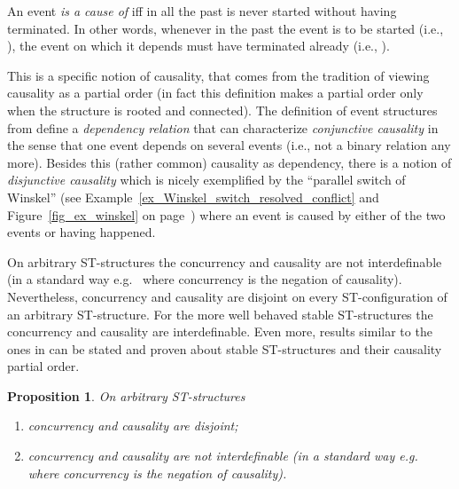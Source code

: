 \documentclass[submission,copyright,creativecommons]{eptcs}
\newtheorem{proposition}[theorem]{Proposition}
\begin{document}
An event \textit{ is a cause of } 
iff in all the past  is never started without  having terminated. In other words, whenever in the past the event  is to be started (i.e., ), the event  on which it depends must have terminated already (i.e., ).

This is a specific notion of causality, that comes from the tradition of viewing causality as a partial order (in fact this definition makes a partial order only when the structure is rooted and connected). The definition of event structures from \cite{GlabbeekP09configStruct} define a \textit{dependency relation} that can characterize \textit{conjunctive causality} in the sense that one event depends on several events (i.e., not a binary relation any more). Besides this (rather common) causality as dependency, there is a notion of \textit{disjunctive causality} which is nicely exemplified by the ``parallel switch of Winskel'' (see Example~\ref{ex_Winskel_switch_resolved_conflict} and Figure~\ref{fig_ex_winskel} on page~\pageref{fig_ex_winskel}) where an event  is caused by either of the two events  or  having happened.

On arbitrary ST-structures the concurrency and causality are not interdefinable (in a standard way e.g.\ \cite[Def.5.6]{GlabbeekG01refinement} where concurrency is the negation of causality). Nevertheless, concurrency and causality are disjoint on every ST-configuration of an arbitrary ST-structure.
For the more well behaved stable ST-structures the concurrency and causality are interdefinable. Even more, results similar to the ones in \cite[Sec.5.3]{GlabbeekG01refinement} can be stated and proven about stable ST-structures and their causality partial order.




\begin{proposition}\label{prop_concDisjCausal}
On arbitrary ST-structures 
\begin{enumerate}
\item concurrency and causality are \emph{disjoint};
\item concurrency and causality are \emph{not interdefinable} (in a standard way e.g.\ \cite[Def.5.6]{GlabbeekG01refinement} where concurrency is the negation of causality).
\end{enumerate}
\end{proposition}
\end{document}
